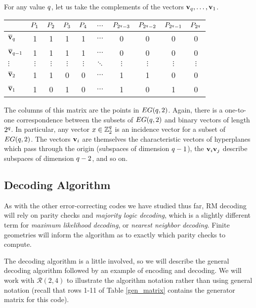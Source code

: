 \documentclass[12pt,twoside]{reedthesis}
\theoremstyle{definition}
\newcommand{\Z}{\mathbb{Z}}
\begin{document}
For any value $q$, let us take the complements of the vectors $\mathbf{v}_{q}, \ldots, \mathbf{v}_{1}$.

\begin{center}
\begin{tabular}{ l | c c c c c c c c c }
& $P_{1}$ & $P_{2}$ & $P_{3}$ & $P_{4}$ & $\ldots$ &$P_{2^q-3}$ & $P_{2^q-2}$ & $P_{2^q-1}$ & $P_{2^q}$\\
\hline
$\overline{\mathbf{v}}_{q}$ & 1 & 1 & 1 & 1 &$\ldots$ & 0 & 0 & 0 & 0\\
$\overline{\mathbf{v}}_{q-1}$ &1 & 1 & 1 & 1 &$\ldots$ & 0 & 0 & 0 & 0\\
$\vdots$ &$\vdots$ &$\vdots$ &$\vdots$ &$\vdots$ &$\ddots$ &$\vdots$ &$\vdots$ &$\vdots$ &$\vdots$ \\
$\overline{\mathbf{v}}_{2}$ & 1 & 1 & 0 & 0 & $\ldots$ & 1 & 1 & 0 & 0\\   
$\overline{\mathbf{v}}_{1}$ & 1 & 0 & 1 & 0 &$\ldots$ & 1 & 0 & 1 & 0\\   
\end{tabular}
\end{center}
The columns of this matrix are the points in $EG(q,2)$. Again, there is a one-to-one correspondence between the subsets of $EG(q,2)$ and binary vectors of length $2^q$. In particular, any vector $x \in \Z_2^\numin$ is an incidence vector for a subset of $EG(q,2)$. The vectors $\mathbf{v}_{i}$ are themselves the characteristic vectors of hyperplanes which pass through the origin (subspaces of dimension $q-1$), the $\mathbf{v}_{i}\mathbf{v}_{j}$ describe subspaces of dimension $q-2$, and so on.

\subsection{Decoding Algorithm}
As with the other error-correcting codes we have studied thus far, RM decoding will rely on parity checks and \textit{majority logic decoding}, which is a slightly different term for \textit{maximum likelihood decoding}, or \textit{nearest neighbor decoding}. Finite geometries will inform the algorithm as to exactly which parity checks to compute.

The decoding algorithm is a little involved, so we will describe the general decoding algorithm followed by an example of encoding and decoding.
We will work with $\mathscr{R}(2,4)$ to illustrate the algorithm notation rather than using general notation (recall that rows 1-11 of Table \ref{gen_matrix} contains the generator matrix for this code).
\end{document}
